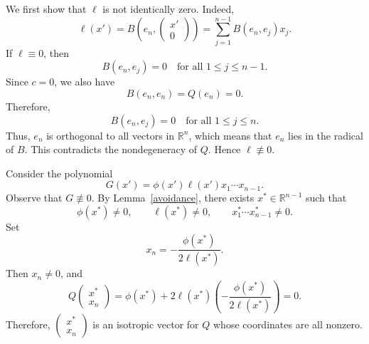 \documentclass[10pt,a4paper]{amsart}
\newenvironment{pf}{\proof}{\endproof}
\begin{document}
\begin{pf}
We first show that $\ell$ is not identically zero. Indeed,
\[
\ell(x')=
B\left(e_n,\begin{pmatrix}x'\\0\end{pmatrix}\right)
=
\sum_{j=1}^{n-1}B(e_n,e_j)x_j.
\]
If $\ell\equiv 0$, then
\[
B(e_n,e_j)=0
\quad\text{for all } 1\le j\le n-1.
\]
Since $c=0$, we also have
\[
B(e_n,e_n)=Q(e_n)=0.
\]
Therefore,
\[
B(e_n,e_j)=0
\quad\text{for all } 1\le j\le n.
\]
Thus, $e_n$ is orthogonal to all vectors in $\mathbb{R}^n$, which means that
$e_n$ lies in the radical of $B$. This contradicts the nondegeneracy of $Q$.
Hence $\ell\not\equiv 0$.

Consider the polynomial
\[
G(x')=\phi(x')\ell(x')x_1\cdots x_{n-1}.
\]
Observe that $G\not\equiv 0$. By Lemma~\ref{avoidance}, there exists
$x^\ast\in\mathbb{R}^{n-1}$ such that
\[
\phi(x^\ast)\neq 0,\qquad
\ell(x^\ast)\neq 0,\qquad
x_1^\ast\cdots x_{n-1}^\ast\neq 0.
\]
Set
\[
x_n=-\frac{\phi(x^\ast)}{2\ell(x^\ast)}.
\]
Then $x_n\neq 0$, and
\[
Q\begin{pmatrix}x^\ast\\x_n\end{pmatrix}
=
\phi(x^\ast)+2\ell(x^\ast)
\left(-\frac{\phi(x^\ast)}{2\ell(x^\ast)}\right)
=0.
\]
Therefore,
\(
\begin{pmatrix}x^\ast\\x_n\end{pmatrix}
\)
is an isotropic vector for $Q$ whose coordinates are all nonzero.
\end{pf}
\end{document}
